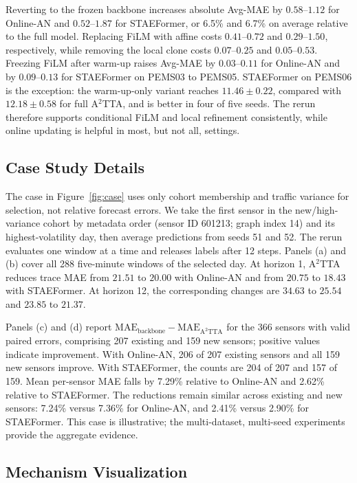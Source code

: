 Reverting to the frozen backbone increases absolute Avg-MAE by
$0.58$--$1.12$ for Online-AN and $0.52$--$1.87$ for STAEFormer, or 6.5\% and
6.7\% on average relative to the full model. Replacing FiLM with affine costs
$0.41$--$0.72$ and $0.29$--$1.50$, respectively, while removing the local
clone costs $0.07$--$0.25$ and $0.05$--$0.53$. Freezing FiLM after warm-up
raises Avg-MAE by $0.03$--$0.11$ for Online-AN and by $0.09$--$0.13$ for
STAEFormer on PEMS03 to PEMS05. STAEFormer on PEMS06 is the exception: the warm-up-only
variant reaches $11.46\!\pm\!0.22$, compared with $12.18\!\pm\!0.58$ for full
A$^2$TTA, and is better in four of five seeds. The rerun therefore supports
conditional FiLM and local refinement consistently, while online updating is
helpful in most, but not all, settings.


\subsection{Case Study Details}
\label{app:case_details}

The case in Figure~\ref{fig:case} uses only cohort membership and traffic variance for selection, not relative forecast errors. We take the first sensor in the new/high-variance cohort by metadata order (sensor ID 601213; graph index 14) and its highest-volatility day, then average predictions from seeds 51 and 52. The rerun evaluates one window at a time and releases labels after 12 steps. Panels (a) and (b) cover all 288 five-minute windows of the selected day. At horizon 1, A$^2$TTA reduces trace MAE from $21.51$ to $20.00$ with Online-AN and from $20.75$ to $18.43$ with STAEFormer. At horizon 12, the corresponding changes are $34.63$ to $25.54$ and $23.85$ to $21.37$.


Panels (c) and (d) report $\mathrm{MAE}_{\mathrm{backbone}}-\mathrm{MAE}_{\mathrm{A^2TTA}}$ for the 366 sensors with valid paired errors, comprising 207 existing and 159 new sensors; positive values indicate improvement. With Online-AN, 206 of 207 existing sensors and all 159 new sensors improve. With STAEFormer, the counts are 204 of 207 and 157 of 159. Mean per-sensor MAE falls by 7.29\% relative to Online-AN and 2.62\% relative to STAEFormer. The reductions remain similar across existing and new sensors: 7.24\% versus 7.36\% for Online-AN, and 2.41\% versus 2.90\% for STAEFormer. This case is illustrative; the multi-dataset, multi-seed experiments provide the aggregate evidence.



\subsection{Mechanism Visualization}
\label{app:mechanism_vis}

